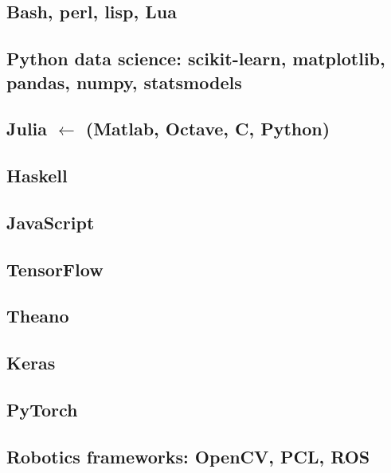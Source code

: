 %
%

\subsection{Bash, perl, lisp, Lua}

\subsection{Python data science: scikit-learn, matplotlib, pandas,
              numpy, statsmodels}

\subsection{Julia $\leftarrow$ (Matlab, Octave, C, Python)}

\subsection{Haskell}

\subsection{JavaScript}

\subsection{TensorFlow}

\subsection{Theano}

\subsection{Keras}

\subsection{PyTorch}

\subsection{Robotics frameworks: OpenCV, PCL, ROS}
